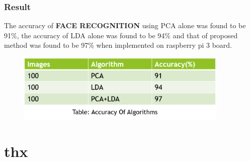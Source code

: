 \documentclass[xcolor=dvipsnames]{beamer}
\newenvironment{reference}[2]{
  \begin{textblock*}{\textwidth}(#1,#2)
     \bgroup\fontsize{6pt}{\baselineskip}\selectfont\color[RGB]{0,112,192}}{\egroup\end{textblock*}}
\begin{document}
    \begin{frame}
    \frametitle{Result}
    The accuracy of \textbf{FACE RECOGNITION} using PCA alone was found to be 91\%, the accuracy of LDA alone was found to be 94\% and that of proposed method was found to be 97\% when implemented on raspberry pi 3 board. 
    \begin{figure}[H]
        \graphicspath{{figs/}}
        \includegraphics[width=0.9\textwidth]{img7.png}
    \end{figure}
    \end{frame}
    
    \section*{thx}
        \begin{frame}
        \begin{center}
        \fontsize{30pt}{\baselineskip}\selectfont {}
        \end{center}
        \begin{reference}{0mm}{80mm}
        \end{reference}
        \end{frame}
\end{document}
